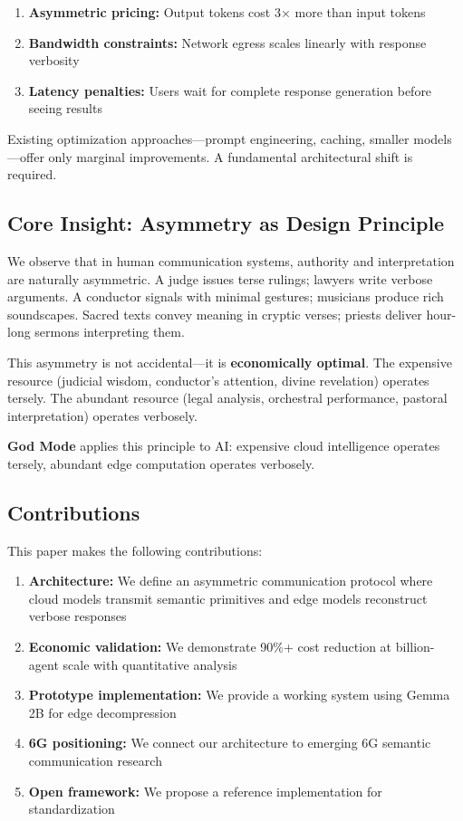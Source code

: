 \documentclass{article}
\begin{document}
\begin{enumerate}
    \item \textbf{Asymmetric pricing:} Output tokens cost 3× more than input tokens
    \item \textbf{Bandwidth constraints:} Network egress scales linearly with response verbosity
    \item \textbf{Latency penalties:} Users wait for complete response generation before seeing results
\end{enumerate}

Existing optimization approaches---prompt engineering, caching, smaller models---offer only marginal improvements. A fundamental architectural shift is required.

\subsection{Core Insight: Asymmetry as Design Principle}

We observe that in human communication systems, authority and interpretation are naturally asymmetric. A judge issues terse rulings; lawyers write verbose arguments. A conductor signals with minimal gestures; musicians produce rich soundscapes. Sacred texts convey meaning in cryptic verses; priests deliver hour-long sermons interpreting them.

This asymmetry is not accidental---it is \textbf{economically optimal}. The expensive resource (judicial wisdom, conductor's attention, divine revelation) operates tersely. The abundant resource (legal analysis, orchestral performance, pastoral interpretation) operates verbosely.

\textbf{God Mode} applies this principle to AI: expensive cloud intelligence operates tersely, abundant edge computation operates verbosely.

\subsection{Contributions}

This paper makes the following contributions:

\begin{enumerate}
    \item \textbf{Architecture:} We define an asymmetric communication protocol where cloud models transmit semantic primitives and edge models reconstruct verbose responses
    \item \textbf{Economic validation:} We demonstrate 90\%+ cost reduction at billion-agent scale with quantitative analysis
    \item \textbf{Prototype implementation:} We provide a working system using Gemma 2B for edge decompression
    \item \textbf{6G positioning:} We connect our architecture to emerging 6G semantic communication research
    \item \textbf{Open framework:} We propose a reference implementation for standardization
\end{enumerate}
\end{document}
